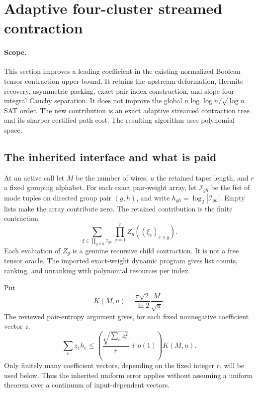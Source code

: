 \section{Adaptive four-cluster streamed contraction}
\label{sec:new-adaptive-separator}

\paragraph{Scope.}
This section improves a leading coefficient in the existing normalized
Boolean tensor-contraction upper bound. It retains the upstream deformation,
Hermite recovery, asymmetric packing, exact pair-index construction, and
slope-four integral Cauchy separation. It does not improve the global
$n\log\log n/\sqrt{\log n}$ SAT order. The new contribution is an exact
adaptive streamed contraction tree and its sharper certified path cost.
The resulting algorithm uses polynomial space.

\subsection{The inherited interface and what is paid}
At an active call let $M$ be the number of wires, $u$ the retained taper
length, and $r$ a fixed grouping alphabet. For each exact pair-weight array,
let $\mathcal I_{gh}$ be the list of mode tuples on directed group pair
$(g,h)$, and write $h_{gh}=\log_2|\mathcal I_{gh}|$. Empty lists make the
array contribute zero. The retained contribution is the finite contraction
\[
 \sum_{\xi\in\prod_{g\ne h}\mathcal I_{gh}}
          \prod_{g=1}^r Z_g((\xi_e)_{e\ni g}).
\]
Each evaluation of $Z_g$ is a genuine recursive child contraction. It is
not a free tensor oracle. The imported exact-weight dynamic program gives
list counts, ranking, and unranking with polynomial resources per index.

Put
\[
 K(M,u)=\frac{\pi\sqrt2}{\ln2}\frac M{\sqrt u}.
\]
The reviewed pair-entropy argument gives, for each fixed nonnegative
coefficient vector $z$,
\begin{equation}\label{eq:new-weighted-entropy}
 \sum_e z_e h_e\le
 \left(\frac{\sqrt{\sum_ez_e^2}}r+o(1)\right)K(M,u).
\end{equation}
Only finitely many coefficient vectors, depending on the fixed integer
$r$, will be used below. Thus the inherited uniform error applies without
assuming a uniform theorem over a continuum of input-dependent vectors.

